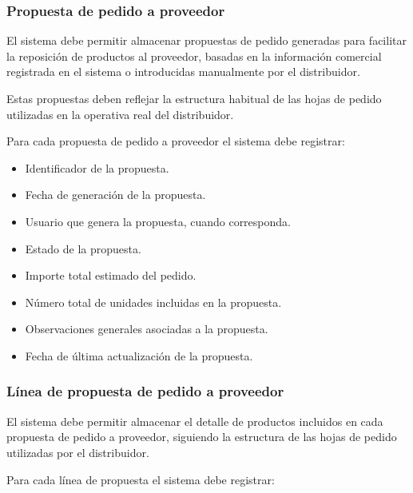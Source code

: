\subsubsection*{Propuesta de pedido a proveedor}

El sistema debe permitir almacenar propuestas de pedido generadas para facilitar la reposición de productos al proveedor, basadas en la información comercial registrada en el sistema o introducidas manualmente por el distribuidor.

Estas propuestas deben reflejar la estructura habitual de las hojas de pedido utilizadas en la operativa real del distribuidor.

Para cada propuesta de pedido a proveedor el sistema debe registrar:

\begin{itemize}

    \item Identificador de la propuesta.
    \item Fecha de generación de la propuesta.
    \item Usuario que genera la propuesta, cuando corresponda.
    \item Estado de la propuesta.
    \item Importe total estimado del pedido.
    \item Número total de unidades incluidas en la propuesta.
    \item Observaciones generales asociadas a la propuesta.
    \item Fecha de última actualización de la propuesta.

\end{itemize}

\subsubsection*{Línea de propuesta de pedido a proveedor}

El sistema debe permitir almacenar el detalle de productos incluidos en cada propuesta de pedido a proveedor, siguiendo la estructura de las hojas de pedido utilizadas por el distribuidor.

Para cada línea de propuesta el sistema debe registrar:

